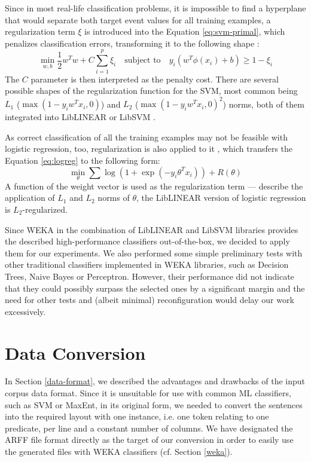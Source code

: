 \documentclass[12pt,notitlepage]{report}
\begin{document}
Since in most real-life classification problems, it is impossible to find a hyperplane that would separate both target event values for all training examples, a regularization \citep{neumaier98} term $\xi$ is introduced into the Equation \ref{eq:svm-primal}, which penalizes classification errors, transforming it to the following shape \citep{cortes95}:
\begin{equation}
\min_{w,b} \frac{1}{2}w^T w + C\sum_{i=1}^p \xi_i \quad\mbox{subject to}\quad y_i(w^T\phi(x_i) + b)\geq 1 - \xi_i
\end{equation}
The $C$ parameter is then interpreted as the penalty cost. There are several possible shapes of the regularization function for the SVM, most common being $L_1$ ($\max(1-y_i w^T x_i, 0)$) and $L_2$ ($\max(1-y_i w^T x_i, 0)^2$) norms, both of them integrated into LibLINEAR or LibSVM \citep{fan08,chang01}.

As correct classification of all the training examples may not be feasible with logistic regression, too, regularization is also applied to it \citep{ng04,fan08}, which transfers the Equation \ref{eq:logreg} to the following form:
\begin{equation}
\min_\theta \sum\log(1 + \exp(-y_i\theta^T x_i)) + R(\theta)
\end{equation}
A function of the weight vector is used as the regularization term --- \citet{ng04} describe the application of $L_1$ and $L_2$ norms of $\theta$, the LibLINEAR version of logistic regression is $L_2$-regularized.

Since WEKA in the combination of LibLINEAR and LibSVM libraries provides the described high-performance classifiers out-of-the-box, we decided to apply them for our experiments. We also performed some simple preliminary tests with other traditional classifiers implemented in WEKA libraries, such as Decision Trees, Naive Bayes or Perceptron. However, their performance did not indicate that they could possibly surpass the selected ones by a significant margin and the need for other tests and (albeit minimal) reconfiguration would delay our work excessively.

\section{Data Conversion}\label{conversion}

In Section \ref{data-format}, we described the advantages and drawbacks of the input corpus data format. Since it is unsuitable for use with common ML classifiers, such as SVM or MaxEnt, in its original form, we needed to convert the sentences into the required layout with one instance, i.e. one token relating to one predicate, per line and a constant number of columns. We have designated the ARFF file format directly as the target of our conversion in order to easily use the generated files with WEKA classifiers (cf. Section \ref{weka}).
\end{document}
